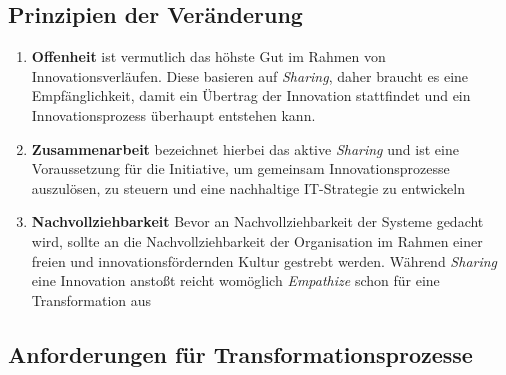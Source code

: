 \subsection{Prinzipien der Veränderung}
\label{prinzipien-verand}
\begin{enumerate}
    \item \textbf{Offenheit} \cite{Brockhoff2006} ist vermutlich das höhste Gut im Rahmen von Innovationsverläufen. Diese basieren auf \emph{Sharing}, daher braucht es eine Empfänglichkeit, damit ein Übertrag der Innovation stattfindet und ein Innovationsprozess überhaupt entstehen kann.
    
    \item \textbf{Zusammenarbeit} bezeichnet hierbei das aktive \emph{Sharing} und ist eine Voraussetzung für die Initiative, um gemeinsam Innovationsprozesse auszulösen, zu steuern und eine nachhaltige IT-Strategie zu entwickeln
    
    \item \textbf{Nachvollziehbarkeit} Bevor an Nachvollziehbarkeit der Systeme gedacht wird, sollte an die Nachvollziehbarkeit der Organisation im Rahmen einer freien und innovationsfördernden Kultur gestrebt werden. Während \emph{Sharing} eine Innovation anstoßt reicht womöglich \emph{Empathize} schon für eine Transformation aus
    

\end{enumerate}

\subsection{Anforderungen für Transformationsprozesse}

